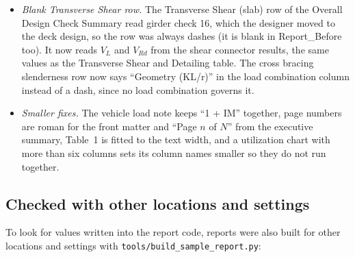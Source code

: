 \documentclass[11pt,a4paper]{article}
\newcommand{\file}[1]{\nolinkurl{#1}}
\begin{document}
\begin{itemize}
  \item \textit{Blank Transverse Shear row.} The Transverse Shear (slab) row of the Overall Design Check Summary read girder check 16, which the designer moved to the deck design, so the row was always dashes (it is blank in Report\_Before too). It now reads $V_L$ and $V_{Rd}$ from the shear connector results, the same values as the Transverse Shear and Detailing table. The cross bracing slenderness row now says ``Geometry (KL/r)'' in the load combination column instead of a dash, since no load combination governs it.
  \item \textit{Smaller fixes.} The vehicle load note keeps ``1 + IM'' together, page numbers are roman for the front matter and ``Page $n$ of $N$'' from the executive summary, Table~1 is fitted to the text width, and a utilization chart with more than six columns sets its column names smaller so they do not run together.
\end{itemize}

\subsection{Checked with other locations and settings}
\label{sec:other-inputs}

To look for values written into the report code, reports were also built for other locations and settings with \file{tools/build_sample_report.py}:
\end{document}
